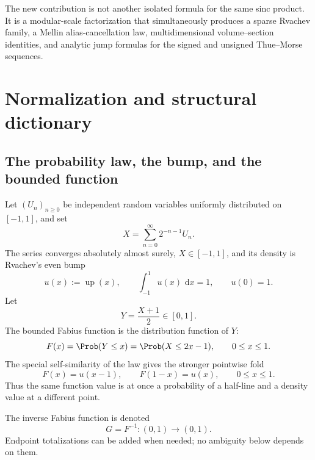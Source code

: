 \documentclass[11pt,oneside]{article}
\theoremstyle{definition}
\newcommand{\dd}{\,\mathrm d}
\newcommand{\Up}{\operatorname{up}}
\begin{document}
\begin{statusboxPartx}
The new contribution is not another isolated formula for the same sinc product.
It is a modular-scale factorization that simultaneously produces a sparse
Rvachev family, a Mellin alias-cancellation law, multidimensional volume--section
identities, and analytic jump formulas for the signed and unsigned Thue--Morse
sequences.
\end{statusboxPartx}

\section{Normalization and structural dictionary}
\label{p2:sec:normalization}

\subsection{The probability law, the bump, and the bounded function}

Let $(U_n)_{n\ge0}$ be independent random variables uniformly distributed on
$[-1,1]$, and set
\begin{equation}
 X=\sum_{n=0}^{\infty}2^{-n-1}U_n.                         \label{p2:eq:X-series}
\end{equation}
The series converges absolutely almost surely, $X\in[-1,1]$, and its density is
Rvachev's even bump
\begin{equation}
 u(x):=\Up(x),\qquad \int_{-1}^{1}u(x)\,\dd x=1,
 \qquad u(0)=1.                                            \label{p2:eq:u-normalization}
\end{equation}
Let
\begin{equation}
 Y=\frac{X+1}{2}\in[0,1].                                  \label{p2:eq:Y-def}
\end{equation}
The bounded Fabius function is the distribution function of $Y$:
\begin{equation}
 F(x)=\Prob(Y\le x)=\Prob(X\le2x-1),\qquad 0\le x\le1.   \label{p2:eq:F-cdf}
\end{equation}
The special self-similarity of the law gives the stronger pointwise fold
\begin{equation}
 F(x)=u(x-1),\qquad F(1-x)=u(x),\qquad 0\le x\le1.          \label{p2:eq:F-u-fold}
\end{equation}
Thus the same function value is at once a probability of a half-line and a
density value at a different point.

The inverse Fabius function is denoted
\begin{equation}
 G=F^{-1}:(0,1)\longrightarrow(0,1).                       \label{p2:eq:G-def}
\end{equation}
Endpoint totalizations can be added when needed; no ambiguity below depends on
them.
\end{document}

